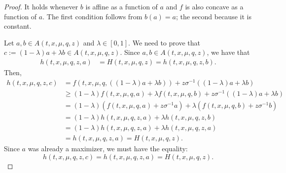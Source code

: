 \documentclass[11pt]{article}
\theoremstyle{definition}
\begin{document}
\begin{proof}
    It holds whenever \( b \) is affine as a function of \( a \) and \( f \) is also concave as a function of \( a \). The first condition follows from \( b(a) = a \); the second because it is constant.

    Let \( a,b \in A(t,x,\mu,q,z) \) and \( \lambda \in [0,1] \). We need to prove that \( c := (1-\lambda) a + \lambda b \in A(t,x,\mu,q,z) \).
 Since \( a,b \in A(t,x,\mu,q,z) \), we have that  
    \begin{align*}
        h(t,x,\mu,q,z,a) &= H(t,x,\mu,q,z) = h(t,x,\mu,q,z,b).
    \end{align*}
    Then,  
    \begin{align*}
        h(t,x,\mu,q,z,c)
        &= f(t,x,\mu,q,((1-\lambda) a + \lambda b)) + z \sigma^{-1}((1-\lambda) a + \lambda b)\\
        &\geq (1-\lambda) f(t,x,\mu,q,a) + \lambda f(t,x,\mu,q,b) + z \sigma^{-1}((1-\lambda) a + \lambda b)\\
        &= (1-\lambda) (f(t,x,\mu,q,a) + z \sigma^{-1} a) + \lambda (f(t,x,\mu,q,b) + z \sigma^{-1} b)\\
        &= (1-\lambda) h(t,x,\mu,q,z,a) + \lambda h(t,x,\mu,q,z,b)\\
        &= (1-\lambda) h(t,x,\mu,q,z,a) + \lambda h(t,x,\mu,q,z,a)\\
        &= h(t,x,\mu,q,z,a) = H(t,x,\mu,q,z).
    \end{align*}
    Since \( a \) was already a maximizer, we must have the equality:  
    \[
    h(t,x,\mu,q,z,c) = h(t,x,\mu,q,z,a) = H(t,x,\mu,q,z).
    \]
    
    

\end{proof}
\end{document}
